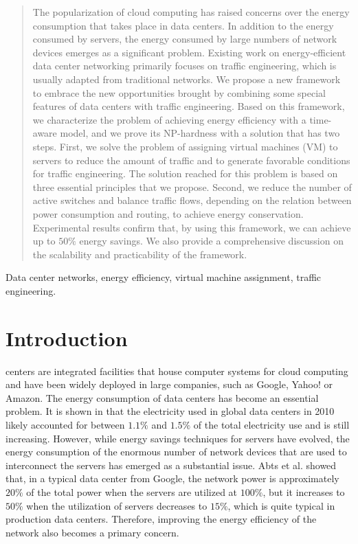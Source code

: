 \documentclass[journal,single-space,two column,twoside,10pt]{IEEEtran}
\begin{document}
\begin{abstract}

The popularization of cloud computing has raised concerns over the energy consumption that takes place in data centers. In addition to the energy consumed by servers, the energy consumed by large numbers of network devices emerges as a significant problem. Existing work on energy-efficient data center networking primarily focuses on traffic engineering, which is usually adapted from traditional networks. We propose a new framework to embrace the new opportunities brought by combining some special features of data centers with traffic engineering. Based on this framework, we characterize the problem of achieving energy efficiency with a time-aware model, and we prove its NP-hardness with a solution that has two steps. First, we solve the problem of assigning virtual machines (VM) to servers to reduce the amount of traffic and to generate favorable conditions for traffic engineering. The solution reached for this problem is based on three essential principles that we propose. Second, we reduce the number of active switches and balance traffic flows, depending on the relation between power consumption and routing, to achieve energy conservation. Experimental results confirm that, by using this framework, we can achieve up to $50\%$ energy savings. We also provide a comprehensive discussion on the scalability and practicability of the framework.

\end{abstract}

\begin{IEEEkeywords}
Data center networks, energy efficiency, virtual machine assignment, traffic engineering.
\end{IEEEkeywords}

\section{Introduction}
\label{sec:intro}

 centers are integrated facilities that house computer systems for cloud computing and have been widely deployed in large companies, such as Google, Yahoo! or Amazon. The energy consumption of data centers has become an essential problem. It is shown in \cite{Koomey-2011} that the electricity used in global data centers in 2010 likely accounted for between $1.1\%$ and $1.5\%$ of the total electricity use and is still increasing. However, while energy savings techniques for servers have evolved, the energy consumption of the enormous number of network devices that are used to interconnect the servers has emerged as a substantial issue. Abts et al. \cite{Abts_Marty-2010} showed that, in a typical data center from Google, the network power is approximately $20\%$  of the total power when the servers are utilized at $100\%$, but it increases to $50\%$ when the utilization of servers decreases to $15\%$, which is quite typical in production data centers. Therefore, improving the energy efficiency of the network also becomes a primary concern.
\end{document}
